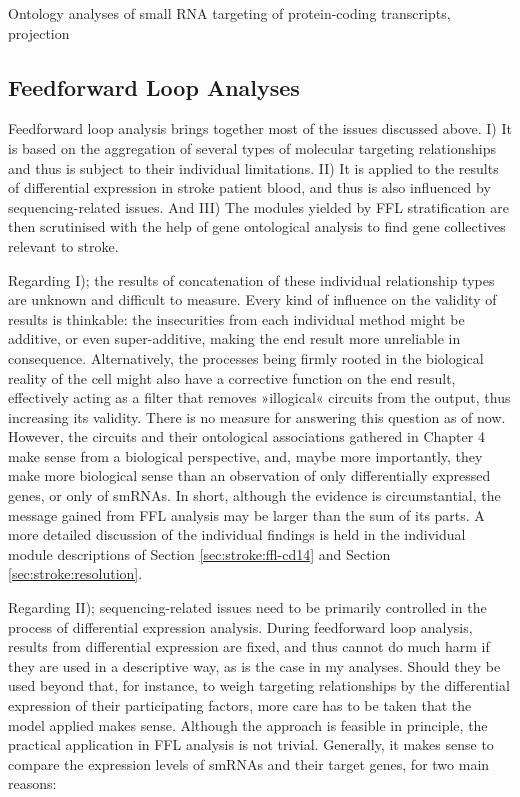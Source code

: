 Ontology analyses of small RNA targeting of protein-coding transcripts, projection

\subsection{Feedforward Loop Analyses}
Feedforward loop analysis brings together most of the issues discussed above. I) It is based on the aggregation of several types of molecular targeting relationships and thus is subject to their individual limitations. II) It is applied to the results of differential expression in stroke patient blood, and thus is also influenced by sequencing-related issues. And III) The modules yielded by FFL stratification are then scrutinised with the help of gene ontological analysis to find gene collectives relevant to stroke.

Regarding I); the results of concatenation of these individual relationship types are unknown and difficult to measure. Every kind of influence on the validity of results is thinkable: the insecurities from each individual method might be additive, or even super-additive, making the end result more unreliable in consequence. Alternatively, the processes being firmly rooted in the biological reality of the cell might also have a corrective function on the end result, effectively acting as a filter that removes »illogical« circuits from the output, thus increasing its validity. There is no measure for answering this question as of now. However, the circuits and their ontological associations gathered in Chapter 4 make sense from a biological perspective, and, maybe more importantly, they make more biological sense than an observation of only differentially expressed genes, or only of smRNAs. In short, although the evidence is circumstantial, the message gained from FFL analysis may be larger than the sum of its parts. A more detailed discussion of the individual findings is held in the individual module descriptions of Section \ref{sec:stroke:ffl-cd14} and Section \ref{sec:stroke:resolution}.

Regarding II); sequencing-related issues need to be primarily controlled in the process of differential expression analysis. During feedforward loop analysis, results from differential expression are fixed, and thus cannot do much harm if they are used in a descriptive way, as is the case in my analyses. Should they be used beyond that, for instance, to weigh targeting relationships by the differential expression of their participating factors, more care has to be taken that the model applied makes sense. Although the approach is feasible in principle, the practical application in FFL analysis is not trivial. Generally, it makes sense to compare the expression levels of smRNAs and their target genes, for two main reasons: 

